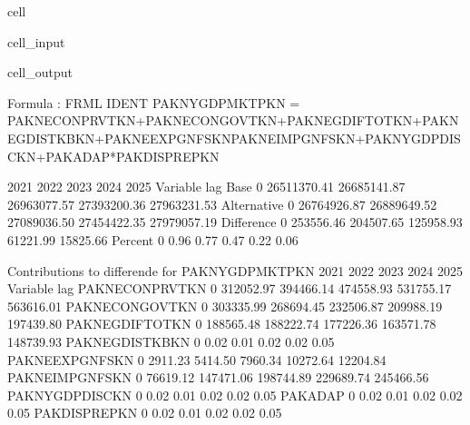 \documentclass[letterpaper,10pt,english]{jupyterBook}
\begin{document}
\begin{sphinxuseclass}{cell}\begin{sphinxVerbatimInput}

\begin{sphinxuseclass}{cell_input}
\begin{sphinxVerbatim}[commandchars=\\\{\}]
 
    \PYG{p}{[}\PYG{p}{]}  
\end{sphinxVerbatim}

\end{sphinxuseclass}\end{sphinxVerbatimInput}
\begin{sphinxVerbatimOutput}

\begin{sphinxuseclass}{cell_output}
\begin{sphinxVerbatim}[commandchars=\\\{\}]
Formula        : FRML \PYGZlt{}IDENT\PYGZgt{} PAKNYGDPMKTPKN = PAKNECONPRVTKN+PAKNECONGOVTKN+PAKNEGDIFTOTKN+PAKNEGDISTKBKN+PAKNEEXPGNFSKN\PYGZhy{}PAKNEIMPGNFSKN+PAKNYGDPDISCKN+PAKADAP*PAKDISPREPKN \PYGZdl{} 

                       2021        2022        2023        2024        2025
Variable    lag                                                            
Base        0   26511370.41 26685141.87 26963077.57 27393200.36 27963231.53
Alternative 0   26764926.87 26889649.52 27089036.50 27454422.35 27979057.19
Difference  0     253556.46   204507.65   125958.93    61221.99    15825.66
Percent     0          0.96        0.77        0.47        0.22        0.06

 Contributions to differende for  PAKNYGDPMKTPKN
                         2021       2022       2023       2024       2025
Variable       lag                                                       
PAKNECONPRVTKN 0   \PYGZhy{}312052.97 \PYGZhy{}394466.14 \PYGZhy{}474558.93 \PYGZhy{}531755.17 \PYGZhy{}563616.01
PAKNECONGOVTKN 0    303335.99  268694.45  232506.87  209988.19  197439.80
PAKNEGDIFTOTKN 0    188565.48  188222.74  177226.36  163571.78  148739.93
PAKNEGDISTKBKN 0        \PYGZhy{}0.02      \PYGZhy{}0.01      \PYGZhy{}0.02      \PYGZhy{}0.02      \PYGZhy{}0.05
PAKNEEXPGNFSKN 0     \PYGZhy{}2911.23   \PYGZhy{}5414.50   \PYGZhy{}7960.34  \PYGZhy{}10272.64  \PYGZhy{}12204.84
PAKNEIMPGNFSKN 0     76619.12  147471.06  198744.89  229689.74  245466.56
PAKNYGDPDISCKN 0        \PYGZhy{}0.02      \PYGZhy{}0.01      \PYGZhy{}0.02      \PYGZhy{}0.02      \PYGZhy{}0.05
PAKADAP        0        \PYGZhy{}0.02      \PYGZhy{}0.01      \PYGZhy{}0.02      \PYGZhy{}0.02      \PYGZhy{}0.05
PAKDISPREPKN   0        \PYGZhy{}0.02      \PYGZhy{}0.01      \PYGZhy{}0.02      \PYGZhy{}0.02      \PYGZhy{}0.05


\end{sphinxVerbatim}
\end{sphinxuseclass}
\end{sphinxVerbatimOutput}
\end{sphinxuseclass}
\end{document}

